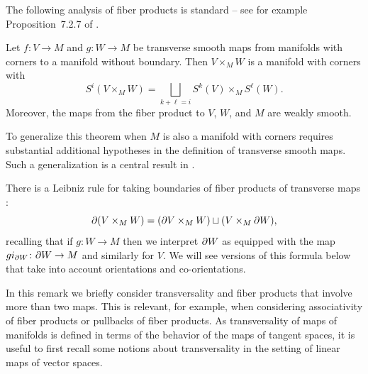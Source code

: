 \begin{remark}
The following analysis of fiber products is standard -- see for example Proposition~7.2.7 of \cite{MaDo92}.

\begin{theorem} \label{pullback}
	Let $f \colon V \to M$ and $g \colon W \to M$ be transverse smooth maps from manifolds with corners to a manifold without boundary.
	Then $V \times_M W$ is a manifold with corners with
	\begin{equation*}
		S^i(V \times_M W) = \bigsqcup_{k + \ell = i} S^k(V) \times_M S^\ell(W).
	\end{equation*}
	Moreover, the maps from the fiber product to $V$, $W$, and $M$ are weakly smooth.
\end{theorem}

To generalize this theorem when $M$ is also a manifold with corners requires substantial additional hypotheses in the definition of transverse smooth maps.
Such a generalization is a central result in \cite{Joy12}.

There is a Leibniz rule for taking boundaries of fiber products of transverse maps \cite[Proposition~6.7]{Joy12}:
\begin{equation}\label{E: product boundary}
	\partial(V\times_M W)=(\partial V \times_M W)\sqcup (V\times_M \partial W),
\end{equation}
recalling that if $g \colon W\to M$ then we interpret $\partial W$ as equipped with the map $gi_{\partial W} \colon \partial W\to M$ and similarly for $V$.
We will see versions of this formula below that take into account orientations and co-orientations.

\begin{remark}\label{R: multiproducts}
	In this remark we briefly consider transversality and fiber products that involve more than two maps.
	This is relevant, for example, when considering associativity of fiber products or pullbacks of fiber products.
	As transversality of maps of manifolds is defined in terms of the behavior of the maps of tangent spaces, it is useful to first recall some notions about transversality in the setting of linear maps of vector spaces.


\end{remark}
\end{remark}
